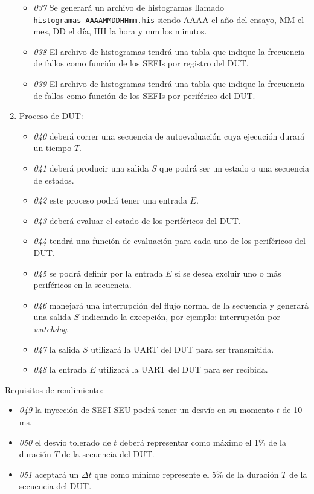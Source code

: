 \begin{enumerate}
\begin{itemize}
			\item \emph{037} Se generará un archivo de histogramas llamado \\ \texttt{histogramas-AAAAMMDDHHmm.his} siendo AAAA el año del ensayo, MM el mes, DD el día, HH la hora y mm los minutos.
			\item \emph{038} El archivo de histogramas tendrá una tabla que indique la frecuencia de fallos como función de los SEFIs por registro del DUT.
			\item \emph{039} El archivo de histogramas tendrá una tabla que indique la frecuencia de fallos como función de los SEFIs por periférico del DUT.
		\end{itemize}
	\item Proceso de DUT:
		\begin{itemize}
			\item \emph{040} deberá correr una secuencia de autoevaluación cuya ejecución durará un tiempo $ T $.
			\item \emph{041} deberá producir una salida $ S $ que podrá ser un estado o una secuencia de estados.
			\item \emph{042} este proceso podrá tener una entrada $ E $.
			\item \emph{043} deberá evaluar el estado de los periféricos del DUT.
			\item \emph{044} tendrá una función de evaluación para cada uno de los periféricos del DUT.
			\item \emph{045} se podrá definir por la entrada $ E $ si se desea excluir uno o más periféricos en la secuencia.
			\item \emph{046} manejará una interrupción del flujo normal de la secuencia y generará una salida $ S $ indicando la excepción, por ejemplo: interrupción por \emph{watchdog}.
			\item \emph{047} la salida $ S $ utilizará la UART del DUT para ser transmitida.
			\item \emph{048} la entrada $ E $ utilizará la UART del DUT para ser recibida.
		\end{itemize}
\end{enumerate}

Requisitos de rendimiento:

\begin{itemize}
	\item \emph{049} la inyección de SEFI-SEU podrá tener un desvío en su momento $ t $ de 10 ms.
	\item \emph{050} el desvío tolerado de $ t $ deberá representar como máximo el 1\% de la duración $ T $ de la secuencia del DUT.
	\item \emph{051} aceptará un $ \Delta t $ que como mínimo represente el 5\% de la duración $ T $ de la secuencia del DUT.
\end{itemize}

